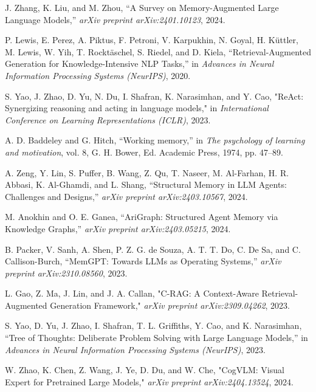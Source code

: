 \documentclass[conference]{IEEEtran}
\begin{document}
\begin{thebibliography}{10}

J. Zhang, K. Liu, and M. Zhou, “A Survey on Memory-Augmented Large Language Models,” \textit{arXiv preprint arXiv:2401.10123}, 2024.

P. Lewis, E. Perez, A. Piktus, F. Petroni, V. Karpukhin, N. Goyal, H. Küttler, M. Lewis, W. Yih, T. Rocktäschel, S. Riedel, and D. Kiela, “Retrieval-Augmented Generation for Knowledge-Intensive NLP Tasks,” in \textit{Advances in Neural Information Processing Systems (NeurIPS)}, 2020.

S. Yao, J. Zhao, D. Yu, N. Du, I. Shafran, K. Narasimhan, and Y. Cao, "ReAct: Synergizing reasoning and acting in language models," in \textit{International Conference on Learning Representations (ICLR)}, 2023.

A. D. Baddeley and G. Hitch, “Working memory,” in \textit{The psychology of learning and motivation}, vol. 8, G. H. Bower, Ed. Academic Press, 1974, pp. 47–89.

A. Zeng, Y. Lin, S. Puffer, B. Wang, Z. Qu, T. Naseer, M. Al-Farhan, H. R. Abbasi, K. Al-Ghamdi, and L. Shang, “Structural Memory in LLM Agents: Challenges and Designs,” \textit{arXiv preprint arXiv:2403.10567}, 2024.

M. Anokhin and O. E. Ganea, “AriGraph: Structured Agent Memory via Knowledge Graphs,” \textit{arXiv preprint arXiv:2403.05215}, 2024.

B. Packer, V. Sanh, A. Shen, P. Z. G. de Souza, A. T. T. Do, C. De Sa, and C. Callison-Burch, “MemGPT: Towards LLMs as Operating Systems,” \textit{arXiv preprint arXiv:2310.08560}, 2023.

L. Gao, Z. Ma, J. Lin, and J. A. Callan, "C-RAG: A Context-Aware Retrieval-Augmented Generation Framework," \textit{arXiv preprint arXiv:2309.04262}, 2023.

S. Yao, D. Yu, J. Zhao, I. Shafran, T. L. Griffiths, Y. Cao, and K. Narasimhan, “Tree of Thoughts: Deliberate Problem Solving with Large Language Models,” in \textit{Advances in Neural Information Processing Systems (NeurIPS)}, 2023.

W. Zhao, K. Chen, Z. Wang, J. Ye, D. Du, and W. Che, "CogVLM: Visual Expert for Pretrained Large Models," \textit{arXiv preprint arXiv:2404.13524}, 2024.

\end{thebibliography}
\end{document}
